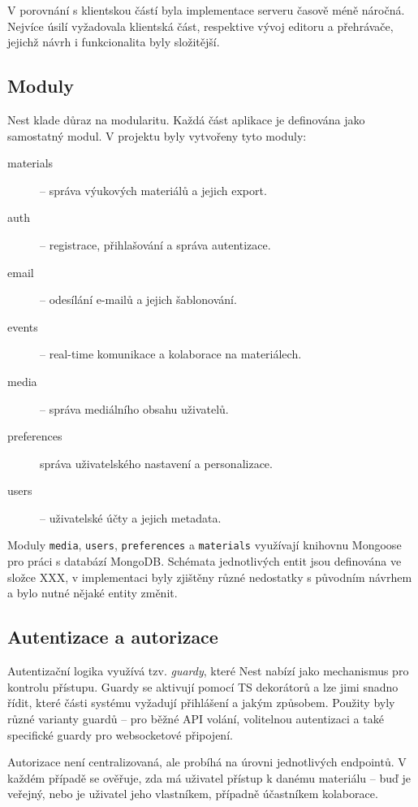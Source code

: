 V porovnání s klientskou částí byla implementace serveru časově méně náročná.
Nejvíce úsilí vyžadovala klientská část, respektive vývoj editoru a přehrávače, jejichž návrh i funkcionalita byly složitější.

\subsection{Moduly}

Nest klade důraz na modularitu. Každá část aplikace je definována jako samostatný modul. V projektu byly vytvořeny tyto moduly:

\begin{description}
    \item[materials] -- správa výukových materiálů a jejich export.
    \item[auth] -- registrace, přihlašování a správa autentizace.
    \item[email] -- odesílání e-mailů a jejich šablonování.
    \item[events] -- real-time komunikace a kolaborace na materiálech.
    \item[media] -- správa mediálního obsahu uživatelů. 
    \item[preferences] správa uživatelského nastavení a personalizace.
    \item[users] -- uživatelské účty a jejich metadata.
\end{description}

Moduly \texttt{media}, \texttt{users}, \texttt{preferences} a \texttt{materials} využívají knihovnu Mongoose pro práci s databází MongoDB. 
Schémata jednotlivých entit jsou definována ve složce XXX, v implementaci byly zjištěny různé nedostatky s původním návrhem a bylo nutné nějaké entity změnit.

\subsection{Autentizace a autorizace}

Autentizační logika využívá tzv. \emph{guardy}, které Nest nabízí jako mechanismus pro kontrolu přístupu.
Guardy se aktivují pomocí TS dekorátorů a lze jimi snadno řídit, které části systému vyžadují přihlášení a jakým způsobem. 
Použity byly různé varianty guardů -- pro běžné API volání, volitelnou autentizaci a také specifické guardy pro websocketové připojení.

Autorizace není centralizovaná, ale probíhá na úrovni jednotlivých endpointů. 
V každém případě se ověřuje, zda má uživatel přístup k danému materiálu -- buď je veřejný, nebo je uživatel jeho vlastníkem, případně účastníkem kolaborace.

